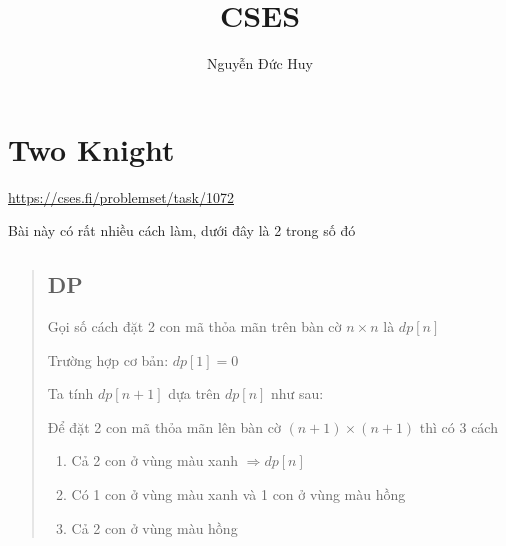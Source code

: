 \documentclass[10pt]{article}
\title{CSES}
\author{Nguyễn Đức Huy}
\begin{document}
\maketitle
\section{Two Knight}
\indent \url{https://cses.fi/problemset/task/1072}

Bài này có rất nhiều cách làm, dưới đây là 2 trong số đó
\begin{quote}
    \subsection{DP}
    Gọi số cách đặt 2 con mã thỏa mãn trên bàn cờ $n \times n$ là $dp[n]$

    Trường hợp cơ bản: $dp[1] = 0$

    Ta tính $dp[n + 1]$ dựa trên $dp[n]$ như sau:

    \begin{center}
    \end{center}
    Để đặt 2 con mã thỏa mãn lên bàn cờ $(n + 1) \times  (n + 1)$ thì có 3 cách
    \begin{enumerate}
        \item Cả 2 con ở vùng màu xanh $\Rightarrow dp[n]$
        \item Có 1 con ở vùng màu xanh và 1 con ở vùng màu hồng
        \item Cả 2 con ở vùng màu hồng
    \end{enumerate}


\end{quote}
\end{document}
